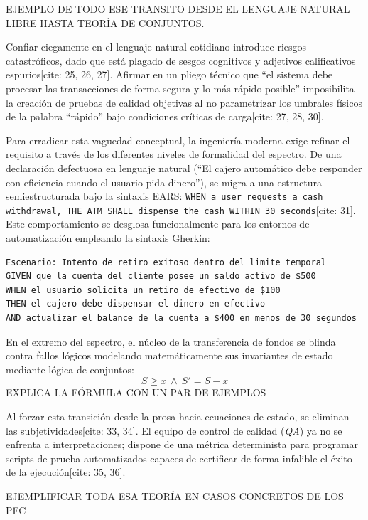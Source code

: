 \documentclass[11pt,a4paper]{article}
\begin{document}
	EJEMPLO DE TODO ESE TRANSITO DESDE EL LENGUAJE NATURAL LIBRE HASTA TEORÍA DE CONJUNTOS.
	
	Confiar ciegamente en el lenguaje natural cotidiano introduce riesgos catastróficos, dado que está plagado de sesgos cognitivos y adjetivos calificativos espurios[cite: 25, 26, 27]. Afirmar en un pliego técnico que ``el sistema debe procesar las transacciones de forma segura y lo más rápido posible'' imposibilita la creación de pruebas de calidad objetivas al no parametrizar los umbrales físicos de la palabra ``rápido'' bajo condiciones críticas de carga[cite: 27, 28, 30].
	
	Para erradicar esta vaguedad conceptual, la ingeniería moderna exige refinar el requisito a través de los diferentes niveles de formalidad del espectro. De una declaración defectuosa en lenguaje natural (``El cajero automático debe responder con eficiencia cuando el usuario pida dinero''), se migra a una estructura semiestructurada bajo la sintaxis EARS: \texttt{WHEN a user requests a cash withdrawal, THE ATM SHALL dispense the cash WITHIN 30 seconds}[cite: 31]. Este comportamiento se desglosa funcionalmente para los entornos de automatización empleando la sintaxis Gherkin:
	
	\begin{lstlisting}[caption={Especificación de Comportamiento en Formato Gherkin}]
Escenario: Intento de retiro exitoso dentro del limite temporal
GIVEN que la cuenta del cliente posee un saldo activo de $500
WHEN el usuario solicita un retiro de efectivo de $100
THEN el cajero debe dispensar el dinero en efectivo
AND actualizar el balance de la cuenta a $400 en menos de 30 segundos
	\end{lstlisting}
	
	En el extremo del espectro, el núcleo de la transferencia de fondos se blinda contra fallos lógicos modelando matemáticamente sus invariantes de estado mediante lógica de conjuntos:
	$$S \ge x \ \wedge \ S' = S - x$$
	EXPLICA LA FÓRMULA CON UN PAR DE EJEMPLOS
	
	Al forzar esta transición desde la prosa hacia ecuaciones de estado, se eliminan las subjetividades[cite: 33, 34]. El equipo de control de calidad (\textit{QA}) ya no se enfrenta a interpretaciones; dispone de una métrica determinista para programar scripts de prueba automatizados capaces de certificar de forma infalible el éxito de la ejecución[cite: 35, 36].
	
	
	EJEMPLIFICAR TODA ESA TEORÍA EN CASOS CONCRETOS DE LOS PFC
	
\end{document}

